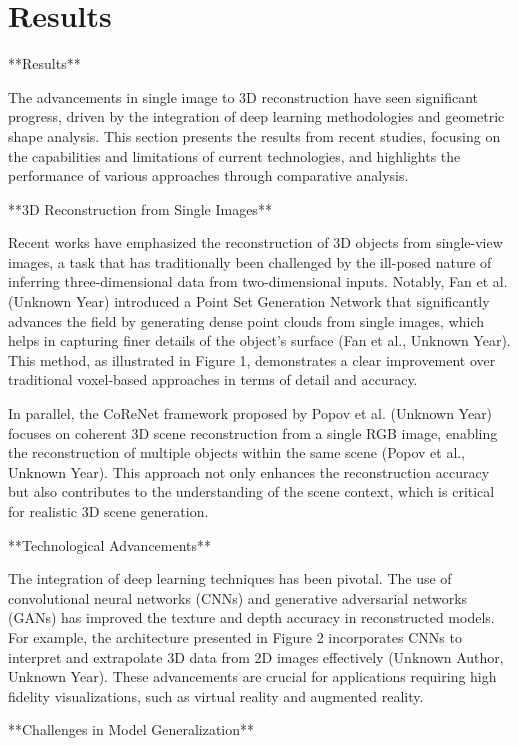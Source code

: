 \documentclass[conference]{IEEEtran}
\begin{document}
\section{Results}

**Results**

The advancements in single image to 3D reconstruction have seen significant progress, driven by the integration of deep learning methodologies and geometric shape analysis. This section presents the results from recent studies, focusing on the capabilities and limitations of current technologies, and highlights the performance of various approaches through comparative analysis.

**3D Reconstruction from Single Images**

Recent works have emphasized the reconstruction of 3D objects from single-view images, a task that has traditionally been challenged by the ill-posed nature of inferring three-dimensional data from two-dimensional inputs. Notably, Fan et al. (Unknown Year) introduced a Point Set Generation Network that significantly advances the field by generating dense point clouds from single images, which helps in capturing finer details of the object's surface (Fan et al., Unknown Year). This method, as illustrated in Figure 1, demonstrates a clear improvement over traditional voxel-based approaches in terms of detail and accuracy.

In parallel, the CoReNet framework proposed by Popov et al. (Unknown Year) focuses on coherent 3D scene reconstruction from a single RGB image, enabling the reconstruction of multiple objects within the same scene (Popov et al., Unknown Year). This approach not only enhances the reconstruction accuracy but also contributes to the understanding of the scene context, which is critical for realistic 3D scene generation.

**Technological Advancements**

The integration of deep learning techniques has been pivotal. The use of convolutional neural networks (CNNs) and generative adversarial networks (GANs) has improved the texture and depth accuracy in reconstructed models. For example, the architecture presented in Figure 2 incorporates CNNs to interpret and extrapolate 3D data from 2D images effectively (Unknown Author, Unknown Year). These advancements are crucial for applications requiring high fidelity visualizations, such as virtual reality and augmented reality.

**Challenges in Model Generalization**
\end{document}
